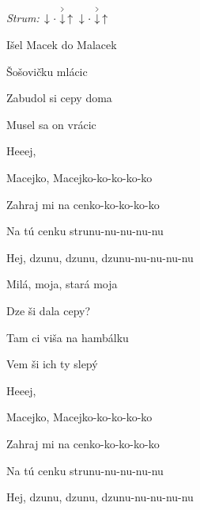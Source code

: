\begin{song}


\begin{headerbox}
\RaiseBoxWithAccents
\textit{Strum:} $\Down\Miss\AccentDown\Up\ \Down\Miss\AccentDown\Up$
\end{headerbox}

\begin{hchordbox}
\end{hchordbox}

\Large

\bigskip

Išel Macek do Malacek \par
{}Šošovičku mlácic \par
{}Zabudol si cepy doma \par
{}Musel sa on vrácic \par

\bigskip

Heeej, \par
{}Macejko, Macejko-ko-ko-ko-ko \par
{}Zahraj mi na cenko-ko-ko-ko-ko \par
{}Na tú cenku strunu-nu-nu-nu-nu \par
{}Hej, dzunu, dzunu, dzunu-nu-nu-nu-nu \par

\bigskip


\bigskip

Milá, moja, stará moja \par
{}Dze ši dala cepy? \par
{}Tam ci viša na hambálku \par
{}Vem ši ich ty slepý \par

\bigskip

Heeej, \par
{}Macejko, Macejko-ko-ko-ko-ko \par
{}Zahraj mi na cenko-ko-ko-ko-ko \par
{}Na tú cenku strunu-nu-nu-nu-nu \par
{}Hej, dzunu, dzunu, dzunu-nu-nu-nu-nu \par

\end{song}